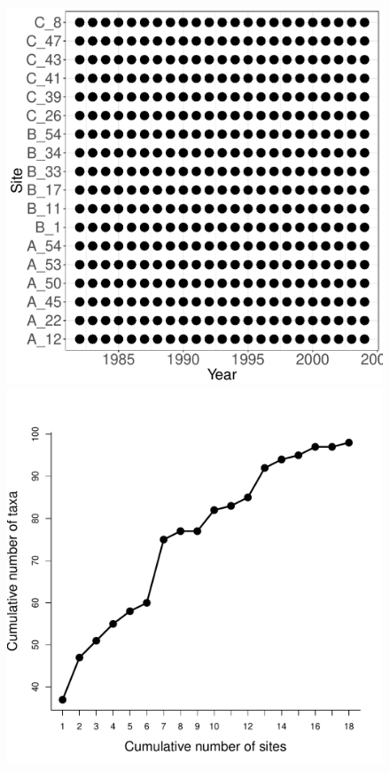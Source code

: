 \documentclass[11pt, oneside]{article}
\begin{document}
\begin{figure}[h!]
\includegraphics[scale = 0.4]{cdr-plantsABC-compagnoni_spatiotemporal_sampling_effort.pdf}
\includegraphics[scale = 0.4]{cdr-plantsABC-compagnoni_species_accumulation_space.pdf}

\end{figure}
\end{document}
